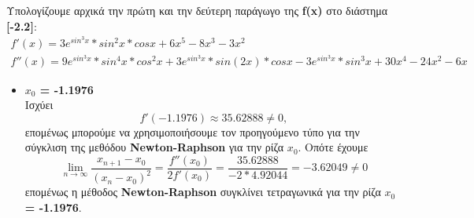 \documentclass[First Project.tex]{subfiles}
\begin{document}
    Υπολογίζουμε αρχικά την πρώτη και την δεύτερη παράγωγο της \textlatin{\textbf{f(x)}} στο διάστημα \textbf{[-2.2]}:
    \begin{gather*}
            f'(x) = 3e^{sin^{3}x}*sin^{2}x*cosx + 6x^{5} - 8x^{3} -3x^{2} \\
            f''(x) = 9e^{sin^{3}x}*sin^{4}x*cos^{2}x + 3e^{sin^{3}x}*sin(2x)*cosx-3e^{sin^{3}x}*sin^{3}x + 30x^{4} - 24x^{2} - 6x            
    \end{gather*}
    
    \vspace{10mm}
    \begin{itemize}
        \item \textbf{$x_{0}$ = -1.1976} \\
            Ισχύει 
            \begin{equation*}
                f'( -1.1976 ) \approx 35.62888 \neq 0 ,
            \end{equation*}   
            επομένως μπορούμε να χρησιμοποιήσουμε τον προηγούμενο τύπο για την σύγκλιση της μεθόδου \textlatin{\textbf{Newton-Raphson}} για 
            την ρίζα \textlatin{\textbf{$x_{0}$}}. Οπότε έχουμε
            \begin{equation*}
                \lim_{n\to\infty} \frac{x_{n+1} - x_{0}}{(x_{n} - x_{0})^{2}} = \frac{f''(x_{0})}{2f'(x_{0})} = \frac{35.62888}{-2 * 4.92044} = -3.62049 \neq 0
            \end{equation*}
            επομένως η μέθοδος \textlatin{\textbf{Newton-Raphson}} συγκλίνει τετραγωνικά για την ρίζα \textbf{$x_{0}$ = -1.1976}.
        

\end{itemize}
\end{document}
